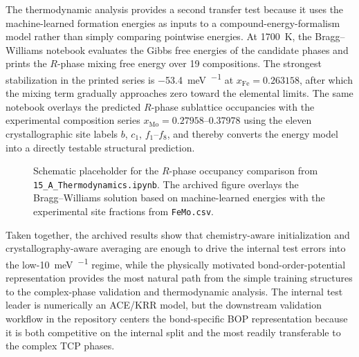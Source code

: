 The thermodynamic analysis provides a second transfer test because it uses the machine-learned formation energies as inputs to a compound-energy-formalism model rather than simply comparing pointwise energies. At \SI{1700}{\kelvin}, the Bragg--Williams notebook evaluates the Gibbs free energies of the candidate phases and prints the $R$-phase mixing free energy over 19 compositions. The strongest stabilization in the printed series is \SI{-53.4}{\milli\electronvolt\per\atom} at $x_{\mathrm{Fe}}=0.263158$, after which the mixing term gradually approaches zero toward the elemental limits. The same notebook overlays the predicted $R$-phase sublattice occupancies with the experimental composition series $x_{\mathrm{Mo}}=0.27958$--0.37978 using the eleven crystallographic site labels $b$, $c_1$, $f_1$--$f_8$, and thereby converts the energy model into a directly testable structural prediction.

\begin{figure}[t]
\centering
{}
\caption{Schematic placeholder for the $R$-phase occupancy comparison from \texttt{15\_A\_Thermodynamics.ipynb}. The archived figure overlays the Bragg--Williams solution based on machine-learned energies with the experimental site fractions from \texttt{FeMo.csv}.}
\label{fig:occupancy}
\end{figure}

Taken together, the archived results show that chemistry-aware initialization and crystallography-aware averaging are enough to drive the internal test errors into the low-\SI{10}{\milli\electronvolt\per\atom} regime, while the physically motivated bond-order-potential representation provides the most natural path from the simple training structures to the complex-phase validation and thermodynamic analysis. The internal test leader is numerically an ACE/KRR model, but the downstream validation workflow in the repository centers the bond-specific BOP representation because it is both competitive on the internal split and the most readily transferable to the complex TCP phases.
